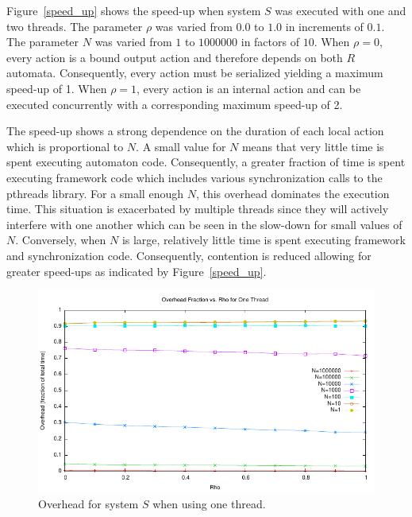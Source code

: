 Figure~\ref{speed_up} shows the speed-up when system $S$ was executed with one and two threads.
The parameter $\rho$ was varied from $0.0$ to $1.0$ in increments of $0.1$.
The parameter $N$ was varied from $1$ to $1000000$ in factors of $10$.
When $\rho = 0$, every action is a bound output action and therefore depends on both $R$ automata.
Consequently, every action must be serialized yielding a maximum speed-up of 1.
When $\rho = 1$, every action is an internal action and can be executed concurrently with a corresponding maximum speed-up of 2.

The speed-up shows a strong dependence on the duration of each local action which is proportional to $N$.
A small value for $N$ means that very little time is spent executing automaton code.
Consequently, a greater fraction of time is spent executing framework code which includes various synchronization calls to the pthreads library.
For a small enough $N$, this overhead dominates the execution time.
This situation is exacerbated by multiple threads since they will actively interfere with one another which can be seen in the slow-down for small values of $N$.
Conversely, when $N$ is large, relatively little time is spent executing framework and synchronization code.
Consequently, contention is reduced allowing for greater speed-ups as indicated by Figure~\ref{speed_up}.

\begin{figure}
\center
\includegraphics[width=\textwidth]{overhead1}
\caption{Overhead for system $S$ when using one thread.\label{overhead1}}
\end{figure}

